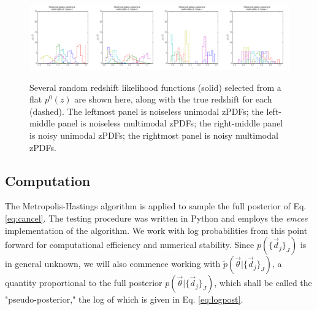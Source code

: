 \documentclass[preprint]{aastex}
\begin{document}
\begin{figure}
\includegraphics[width=0.25\textwidth]{samplepzs-uni-less.png}\includegraphics[width=0.25\textwidth]{samplepzs-multi-less.png}\includegraphics[width=0.25\textwidth]{samplepzs-uni-noise.png}\includegraphics[width=0.25\textwidth]{samplepzs-multi-noise.png}
\caption{Several random redshift likelihood functions (solid) selected from a flat $p^{0}(z)$ are shown here, along with the true redshift for each (dashed).  The leftmost panel is noiseless unimodal zPDFs; the left-middle panel is noiseless multimodal zPDFs; the right-middle panel is noisy unimodal zPDFs; the rightmost panel is noisy multimodal zPDFs.}
\label{fig:pzs}
\end{figure}

\subsection{Computation}
\label{sec:mcmc}

The Metropolis-Hastings algorithm is applied to sample the full posterior of Eq. \ref{eq:cancel}.  The testing procedure was written in Python and employs the \textit{emcee} implementation of the algorithm.  \citep{for12}  We work with log probabilities from this point forward for computational efficiency and numerical stability.  Since $p(\{\vec{d}_{j}\}_{J})$ is in general unknown, we will also commence working with $\tilde{p}(\vec{\theta}|\{\vec{d}_{j}\}_{J})$, a quantity proportional to the full posterior $p(\vec{\theta}|\{\vec{d}_{j}\}_{J})$, which shall be called the "pseudo-posterior," the log of which is given in Eq. \ref{eq:logpost}.
\end{document}
